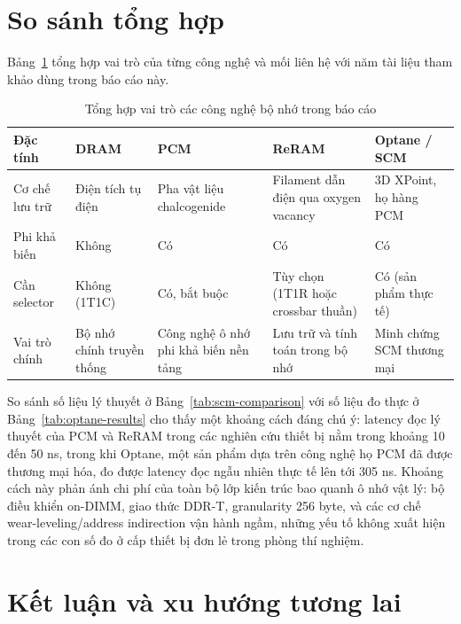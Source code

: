 \documentclass[12pt,a4paper]{article}
\begin{document}
\section{So sánh tổng hợp}
\label{sec:summary}

Bảng~\ref{tab:final-comparison} tổng hợp vai trò của từng công nghệ và mối liên hệ với năm tài liệu tham khảo dùng trong báo cáo này.

\begin{table}[h]
\centering
\caption{Tổng hợp vai trò các công nghệ bộ nhớ trong báo cáo}
\label{tab:final-comparison}
\small
\begin{tabular}{p{2.4cm}p{2.6cm}p{2.6cm}p{2.6cm}p{3.4cm}}
\toprule
\textbf{Đặc tính} & \textbf{DRAM} & \textbf{PCM} & \textbf{ReRAM} & \textbf{Optane / SCM} \\
\midrule
Cơ chế lưu trữ & Điện tích tụ điện & Pha vật liệu chalcogenide & Filament dẫn điện qua oxygen vacancy & 3D XPoint, họ hàng PCM \\
Phi khả biến & Không & Có & Có & Có \\
Cần selector & Không (1T1C) & Có, bắt buộc & Tùy chọn (1T1R hoặc crossbar thuần) & Có (sản phẩm thực tế) \\
Vai trò chính & Bộ nhớ chính truyền thống & Công nghệ ô nhớ phi khả biến nền tảng & Lưu trữ và tính toán trong bộ nhớ & Minh chứng SCM thương mại \\
\bottomrule
\end{tabular}
\end{table}

So sánh số liệu lý thuyết ở Bảng~\ref{tab:scm-comparison} với số liệu đo thực ở Bảng~\ref{tab:optane-results} cho thấy một khoảng cách đáng chú ý: latency đọc lý thuyết của PCM và ReRAM trong các nghiên cứu thiết bị nằm trong khoảng 10 đến 50 ns, trong khi Optane, một sản phẩm dựa trên công nghệ họ PCM đã được thương mại hóa, đo được latency đọc ngẫu nhiên thực tế lên tới 305 ns. Khoảng cách này phản ánh chi phí của toàn bộ lớp kiến trúc bao quanh ô nhớ vật lý: bộ điều khiển on-DIMM, giao thức DDR-T, granularity 256 byte, và các cơ chế wear-leveling/address indirection vận hành ngầm, những yếu tố không xuất hiện trong các con số đo ở cấp thiết bị đơn lẻ trong phòng thí nghiệm.

\section{Kết luận và xu hướng tương lai}
\end{document}
